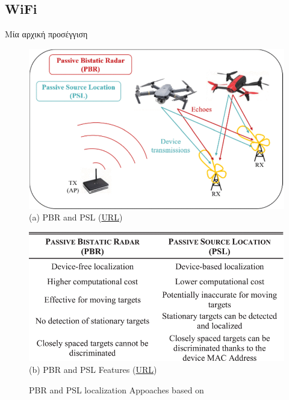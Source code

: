 \subsection{WiFi}
Μία αρχική προσέγγιση \cite{wifi-passive-active-drone-localization}

\begin{figure} [H]
	\centering
		\begin{minipage}{.48\textwidth}
			\centering
			\includegraphics[width=\linewidth]{Images/Related-Work/PBR-and-PSL-approaches.png}
			{(a) PBR and PSL (\href{https://ieeexplore.ieee.org/document/9253794/figures#figures}{URL})}
		\end{minipage}%
		\hspace*{+1cm}
		\begin{minipage}{.48\textwidth}
			\centering
			\includegraphics[width=\linewidth]{Images/Related-Work/PBR-and-PSL-Features.png}
			{(b) PBR and PSL Features (\href{https://ieeexplore.ieee.org/document/9253794/figures#figures}{URL})}
		\end{minipage}
    \hfill \break
    \decoRule
    \caption[PBR and PSL localization Appoaches]{PBR and PSL localization Appoaches based on \cite{wifi-passive-active-drone-localization}}
    \label{fig:[PBR-and-PSL]}
\end{figure}

